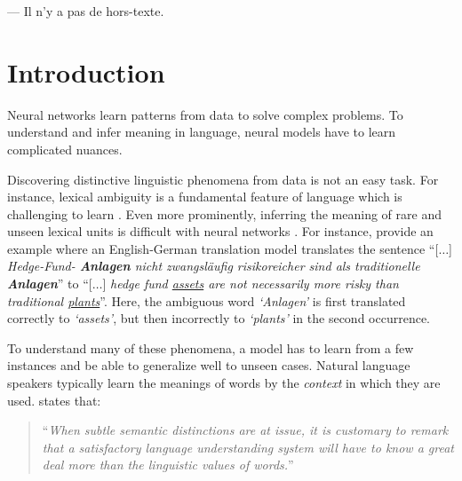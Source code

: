 
\begin{savequote}[45mm]
--- Il n'y a pas de hors-texte.
\end{savequote}

\chapter{Introduction}


\label{chapter:introduction}


Neural networks learn patterns from data to solve complex problems.
To understand and infer meaning in language, neural models have to learn complicated nuances.

Discovering distinctive linguistic phenomena from data is not an easy task. 
For instance, lexical ambiguity is a fundamental feature of language which is challenging to learn \citep{small2013lexical}. 
Even more prominently, inferring the meaning of rare and unseen lexical units is difficult with neural networks \citep{koehn2017six}. 
For instance, \citet{rios-etal-2018-word} provide an example where an English-German translation model translates the sentence ``[$\ldots$] \textit{Hedge-Fund- \textbf{Anlagen} nicht zwangsl\"{a}ufig risikoreicher sind als traditionelle  \textbf{Anlagen}}'' to 
``[$\ldots$] \textit{hedge fund \underline{assets} are not necessarily more risky than traditional \underline{plants}}''. Here, the ambiguous word \textit{`Anlagen'} is first translated correctly to \textit{`assets'}, but then incorrectly to \textit{`plants'} in the second occurrence.

To understand many of these phenomena, a model has to learn from a few instances and be able to generalize well to unseen cases.
%
%
Natural language speakers typically learn the meanings of words by the \textit{context} in which they are used.
 \citet{miller-1985-dictionaries} states that:
\begin{quote}
``\emph{When subtle semantic distinctions are at issue, it is customary to remark that a satisfactory language understanding system will have to know a great deal more than the linguistic values of words.}''
\end{quote}

